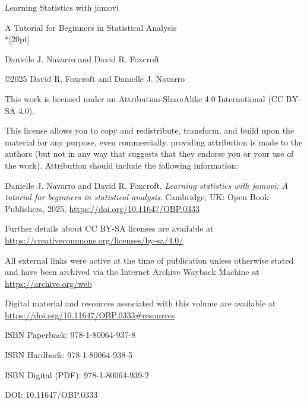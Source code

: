 \hspace{0pt}
\vfill
\begin{center}

\Huge{Learning Statistics with jamovi}

\Large{A Tutorial for Beginners in Statistical Analysis}\\*[20pt]

\normalsize{Danielle J. Navarro and David R. Foxcroft}

\vfill
\end{center}
\hspace{0pt}
\pagebreak

\hspace{0pt}
\vfill

\copyright 2025 David R. Foxcroft and Danielle J. Navarro

This work is licensed under an Attribution-ShareAlike 4.0 International (CC BY-SA 4.0).

This license allows you to copy and redistribute, transform, and build upon the material for any purpose, even commercially. providing attribution is made to the authors (but not in any way that suggests that they endorse you or your use of the work). Attribution should include the following information:

Danielle J. Navarro and David R. Foxcroft, \textit{Learning statistics with jamovi: A tutorial for beginners in statistical analysis}. Cambridge, UK: Open Book Publishers, 2025, \url{https://doi.org/10.11647/OBP.0333}

Further details about CC BY-SA licenses are available at \\ \url{https://creativecommons.org/licenses/by-sa/4.0/}

All external links were active at the time of publication unless otherwise stated and have been archived via the Internet Archive Wayback Machine at \\ \url{https://archive.org/web}

Digital material and resources associated with this volume are available at \\ \url{https://doi.org/10.11647/OBP.0333\#resources}

ISBN Paperback: 978-1-80064-937-8

ISBN Hardback: 978-1-80064-938-5

ISBN Digital (PDF): 978-1-80064-939-2

DOI: 10.11647/OBP.0333


\vfill
\hspace{0pt}
\pagebreak

